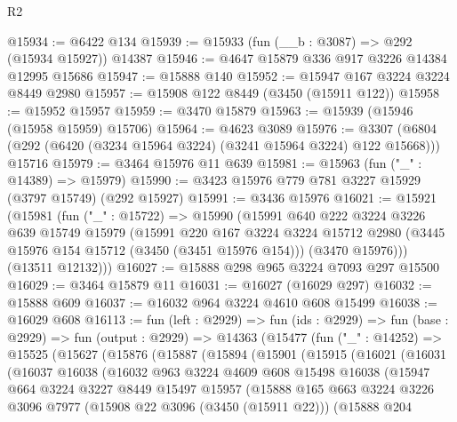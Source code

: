 \begin{lexlean}{R2}
\begin{coremodule}
@15934 := @6422 @134
@15939 := @15933 (fun (__b : @3087) => @292 (@15934 @15927)) @14387
@15946 := @4647 @15879 @336 @917 @3226 @14384 @12995 @15686
@15947 := @15888 @140
@15952 := @15947 @167 @3224 @3224 @8449 @2980
@15957 := @15908 @122 @8449 (@3450 (@15911 @122))
@15958 := @15952 @15957
@15959 := @3470 @15879
@15963 := @15939 (@15946 (@15958 @15959) @15706)
@15964 := @4623 @3089
@15976 := @3307 (@6804 (@292 (@6420 (@3234 @15964 @3224) (@3241 @15964 @3224) @122 @15668))) @15716
@15979 := @3464 @15976 @11 @639
@15981 := @15963 (fun ("_" : @14389) => @15979)
@15990 := @3423 @15976 @779 @781 @3227 @15929 (@3797 @15749) (@292 @15927)
@15991 := @3436 @15976
@16021 := @15921
    (@15981
      (fun ("_" : @15722) =>
      @15990
        (@15991
          @640
          @222
          @3224
          @3226
          @639
          @15749
          @15979
          (@15991
            @220
            @167
            @3224
            @3224
            @15712
            @2980
            (@3445 @15976 @154 @15712 (@3450 (@3451 @15976 @154)))
            (@3470 @15976)))
        (@13511 @12132)))
@16027 := @15888 @298 @965 @3224 @7093 @297 @15500
@16029 := @3464 @15879 @11
@16031 := @16027 (@16029 @297)
@16032 := @15888 @609
@16037 := @16032 @964 @3224 @4610 @608 @15499
@16038 := @16029 @608
@16113 := fun (left : @2929) =>
  fun (ids : @2929) =>
  fun (base : @2929) =>
  fun (output : @2929) =>
  @14363
    (@15477
      (fun ("_" : @14252) =>
      @15525
        (@15627
          (@15876
            (@15887
              (@15894
                (@15901
                  (@15915
                    (@16021
                      (@16031
                        (@16037
                          @16038
                          (@16032
                            @963
                            @3224
                            @4609
                            @608
                            @15498
                            @16038
                            (@15947
                              @664
                              @3224
                              @3227
                              @8449
                              @15497
                              @15957
                              (@15888
                                @165
                                @663
                                @3224
                                @3226
                                @3096
                                @7977
                                (@15908 @22 @3096 (@3450 (@15911 @22)))
                                (@15888
                                  @204

\end{coremodule}
\end{lexlean}
